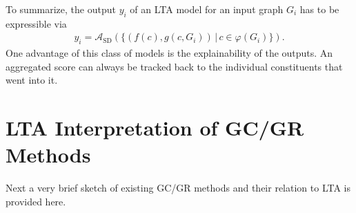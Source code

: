 \documentclass[12pt]{scrartcl}
\begin{document}
To summarize, the output $y_i$ of an LTA model for an input graph $G_i$ has to be expressible via
\begin{align}
	y_i = \mathcal{A}_{\text{SD}}(\{ (f(c), g(c, G_i)) \,|\, c \in \varphi(G_i) \}) \text{.}
\end{align}
One advantage of this class of models is the explainability of the outputs.
An aggregated score can always be tracked back to the individual constituents that went into it.

\section{LTA Interpretation of GC/GR Methods}%
\label{sec:lta-gcr}

Next a very brief sketch of existing GC/GR methods and their relation to LTA is provided here.
\end{document}
